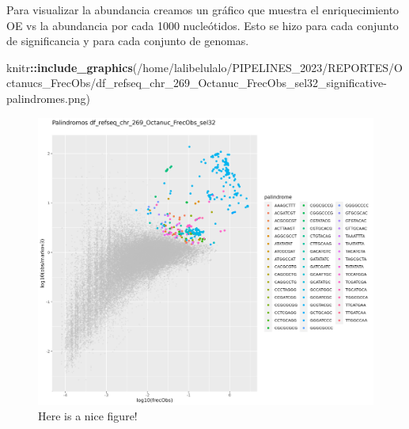 \documentclass[
]{book}
\newenvironment{Shaded}{\begin{snugshade}}{\end{snugshade}}
\newcommand{\FunctionTok}[1]{\textcolor[rgb]{0.13,0.29,0.53}{\textbf{#1}}}
\newcommand{\NormalTok}[1]{#1}
\newcommand{\SpecialCharTok}[1]{\textcolor[rgb]{0.81,0.36,0.00}{\textbf{#1}}}
\newcommand{\StringTok}[1]{\textcolor[rgb]{0.31,0.60,0.02}{#1}}
\begin{document}
Para visualizar la abundancia creamos un gráfico que muestra el enriquecimiento OE vs la abundancia por cada 1000 nucleótidos. Esto se hizo para cada conjunto de significancia y para cada conjunto de genomas.

\begin{Shaded}
\begin{Highlighting}[]
\NormalTok{knitr}\SpecialCharTok{::}\FunctionTok{include\_graphics}\NormalTok{(}\StringTok{\textquotesingle{}/home/lalibelulalo/PIPELINES\_2023/REPORTES/Octanucs\_FrecObs/df\_refseq\_chr\_269\_Octanuc\_FrecObs\_sel32\_significative{-}palindromes.png\textquotesingle{}}\NormalTok{)}
\end{Highlighting}
\end{Shaded}

\begin{figure}

{\centering \includegraphics[width=0.8\linewidth]{../PIPELINES_2023/REPORTES/Octanucs_FrecObs/df_refseq_chr_269_Octanuc_FrecObs_sel32_significative-palindromes} 

}

\caption{Here is a nice figure!}\label{fig:nice-fig}
\end{figure}

  
\end{document}
